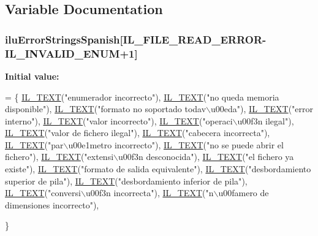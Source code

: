\subsection{Variable Documentation}
\hypertarget{ilu__err-spanish_8h_aa0815dfcc69d1112dfb66ca8e8b21e29}{
\subsubsection[{ilu\-Error\-Strings\-Spanish}]{ ilu\-Error\-Strings\-Spanish\mbox{[}{\bf I\-L\-\_\-\-F\-I\-L\-E\-\_\-\-R\-E\-A\-D\-\_\-\-E\-R\-R\-O\-R}-\/{\bf I\-L\-\_\-\-I\-N\-V\-A\-L\-I\-D\-\_\-\-E\-N\-U\-M}+1\mbox{]}}}\label{ilu__err-spanish_8h_aa0815dfcc69d1112dfb66ca8e8b21e29}
{\bfseries Initial value\-:}
\begin{DoxyCode}
= \{
    \hyperlink{il_8h_a2907c2129d2ba2ebbae6aa6a69b7f685}{IL\_TEXT}(\textcolor{stringliteral}{"enumerador incorrecto"}),
  \hyperlink{il_8h_a2907c2129d2ba2ebbae6aa6a69b7f685}{IL\_TEXT}(\textcolor{stringliteral}{"no queda memoria disponible"}),
    \hyperlink{il_8h_a2907c2129d2ba2ebbae6aa6a69b7f685}{IL\_TEXT}(\textcolor{stringliteral}{"formato no soportado todav\(\backslash\)u00eda"}),
    \hyperlink{il_8h_a2907c2129d2ba2ebbae6aa6a69b7f685}{IL\_TEXT}(\textcolor{stringliteral}{"error interno"}),
    \hyperlink{il_8h_a2907c2129d2ba2ebbae6aa6a69b7f685}{IL\_TEXT}(\textcolor{stringliteral}{"valor incorrecto"}),
  \hyperlink{il_8h_a2907c2129d2ba2ebbae6aa6a69b7f685}{IL\_TEXT}(\textcolor{stringliteral}{"operaci\(\backslash\)u00f3n ilegal"}),
    \hyperlink{il_8h_a2907c2129d2ba2ebbae6aa6a69b7f685}{IL\_TEXT}(\textcolor{stringliteral}{"valor de fichero ilegal"}),
    \hyperlink{il_8h_a2907c2129d2ba2ebbae6aa6a69b7f685}{IL\_TEXT}(\textcolor{stringliteral}{"cabecera incorrecta"}),
    \hyperlink{il_8h_a2907c2129d2ba2ebbae6aa6a69b7f685}{IL\_TEXT}(\textcolor{stringliteral}{"par\(\backslash\)u00e1metro incorrecto"}),
    \hyperlink{il_8h_a2907c2129d2ba2ebbae6aa6a69b7f685}{IL\_TEXT}(\textcolor{stringliteral}{"no se puede abrir el fichero"}),
    \hyperlink{il_8h_a2907c2129d2ba2ebbae6aa6a69b7f685}{IL\_TEXT}(\textcolor{stringliteral}{"extensi\(\backslash\)u00f3n desconocida"}),
    \hyperlink{il_8h_a2907c2129d2ba2ebbae6aa6a69b7f685}{IL\_TEXT}(\textcolor{stringliteral}{"el fichero ya existe"}),
    \hyperlink{il_8h_a2907c2129d2ba2ebbae6aa6a69b7f685}{IL\_TEXT}(\textcolor{stringliteral}{"formato de salida equivalente"}),
    \hyperlink{il_8h_a2907c2129d2ba2ebbae6aa6a69b7f685}{IL\_TEXT}(\textcolor{stringliteral}{"desbordamiento superior de pila"}),
  \hyperlink{il_8h_a2907c2129d2ba2ebbae6aa6a69b7f685}{IL\_TEXT}(\textcolor{stringliteral}{"desbordamiento inferior de pila"}),
    \hyperlink{il_8h_a2907c2129d2ba2ebbae6aa6a69b7f685}{IL\_TEXT}(\textcolor{stringliteral}{"conversi\(\backslash\)u00f3n incorrecta"}),
    \hyperlink{il_8h_a2907c2129d2ba2ebbae6aa6a69b7f685}{IL\_TEXT}(\textcolor{stringliteral}{"n\(\backslash\)u00famero de dimensiones incorrecto"}),

\}
\end{DoxyCode}
